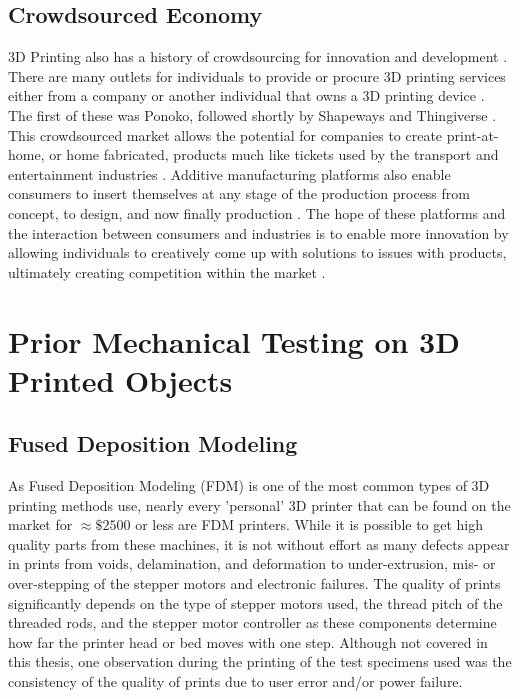 \subsection{Crowdsourced Economy}
	3D Printing also has a history of crowdsourcing for innovation and development \citep{Rayna2016}. There are many outlets for individuals to provide or procure 3D printing services either from a company or another individual that owns a 3D printing device \citep{Rayna2015}. The first of these was Ponoko, followed shortly by Shapeways and Thingiverse \citep{Rayna2015}. This crowdsourced market allows the potential for companies to create print-at-home, or home fabricated, products much like tickets used by the transport and entertainment industries \citep{Rayna2015}. Additive manufacturing platforms also enable consumers to insert themselves at any stage of the production process from concept, to design, and now finally production \citep{Rayna2015}. The hope of these platforms and the interaction between consumers and industries is to enable more innovation by allowing individuals to creatively come up with solutions to issues with products, ultimately creating competition within the market \citep{Rayna2015, Rayna2016}.

\section{Prior Mechanical Testing on 3D Printed Objects}
\subsection{Fused Deposition Modeling}
	As Fused Deposition Modeling (FDM) is one of the most common types of 3D printing methods use, nearly every 'personal' 3D printer that can be found on the market for $\approx \$2500$ or less are FDM printers. While it is possible to get high quality parts from these machines, it is not without effort as many defects appear in prints from voids, delamination, and deformation to under-extrusion, mis- or over-stepping of the stepper motors and electronic failures. The quality of prints significantly depends on the type of stepper motors used, the thread pitch of the threaded rods, and the stepper motor controller as these components determine how far the printer head or bed moves with one step. Although not covered in this thesis, one observation during the printing of the test specimens used was the consistency of the quality of prints due to user error and/or power failure.

